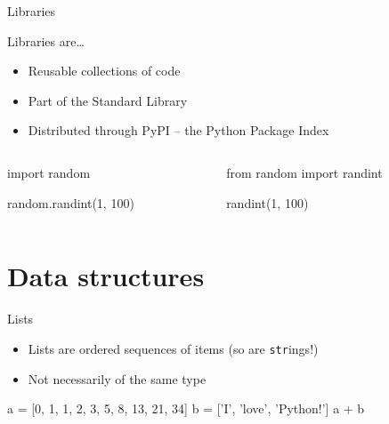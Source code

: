 \begin{frame}[fragile]{Libraries}
    \begin{block}{Libraries are\ldots}
        \begin{itemize}
            \item Reusable collections of code
            \item Part of the Standard Library
            \item Distributed through PyPI -- the Python Package Index
        \end{itemize}
    \end{block}
    \vfill
    \begin{columns}
        \begin{column}{0.5\textwidth}
            \begin{py3}
                import random

                random.randint(1, 100)
            \end{py3}
        \end{column}
        \begin{column}{0.5\textwidth}
            \begin{py3}
                from random import randint

                randint(1, 100)
            \end{py3}
        \end{column}
    \end{columns}
\end{frame}

\section{Data structures}

\begin{frame}[fragile]{Lists}
    \begin{itemize}
        \item Lists are \alert{ordered sequences} of items
              (so are \texttt{str}ings!)
        \item Not necessarily of the same type
    \end{itemize}
    \vfill
    \begin{py3}
        a = [0, 1, 1, 2, 3, 5, 8, 13, 21, 34]
        b = ['I', 'love', 'Python!']
        a + b
    \end{py3}
\end{frame}

